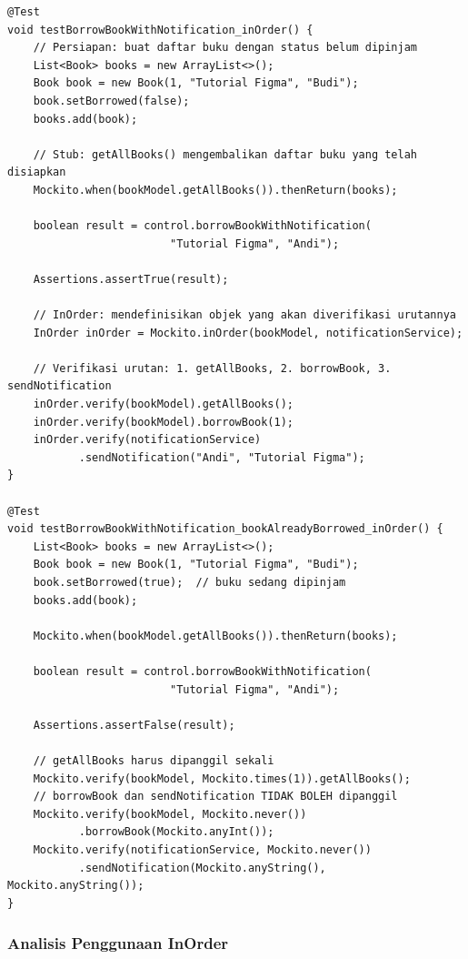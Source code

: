 \documentclass[12pt,a4paper]{article}
\begin{document}
\begin{lstlisting}[caption={Test method peminjaman dengan notifikasi dan InOrder},
                   label={lst:test-notification}]
@Test
void testBorrowBookWithNotification_inOrder() {
    // Persiapan: buat daftar buku dengan status belum dipinjam
    List<Book> books = new ArrayList<>();
    Book book = new Book(1, "Tutorial Figma", "Budi");
    book.setBorrowed(false);
    books.add(book);

    // Stub: getAllBooks() mengembalikan daftar buku yang telah disiapkan
    Mockito.when(bookModel.getAllBooks()).thenReturn(books);

    boolean result = control.borrowBookWithNotification(
                         "Tutorial Figma", "Andi");

    Assertions.assertTrue(result);

    // InOrder: mendefinisikan objek yang akan diverifikasi urutannya
    InOrder inOrder = Mockito.inOrder(bookModel, notificationService);

    // Verifikasi urutan: 1. getAllBooks, 2. borrowBook, 3. sendNotification
    inOrder.verify(bookModel).getAllBooks();
    inOrder.verify(bookModel).borrowBook(1);
    inOrder.verify(notificationService)
           .sendNotification("Andi", "Tutorial Figma");
}

@Test
void testBorrowBookWithNotification_bookAlreadyBorrowed_inOrder() {
    List<Book> books = new ArrayList<>();
    Book book = new Book(1, "Tutorial Figma", "Budi");
    book.setBorrowed(true);  // buku sedang dipinjam
    books.add(book);

    Mockito.when(bookModel.getAllBooks()).thenReturn(books);

    boolean result = control.borrowBookWithNotification(
                         "Tutorial Figma", "Andi");

    Assertions.assertFalse(result);

    // getAllBooks harus dipanggil sekali
    Mockito.verify(bookModel, Mockito.times(1)).getAllBooks();
    // borrowBook dan sendNotification TIDAK BOLEH dipanggil
    Mockito.verify(bookModel, Mockito.never())
           .borrowBook(Mockito.anyInt());
    Mockito.verify(notificationService, Mockito.never())
           .sendNotification(Mockito.anyString(), Mockito.anyString());
}
\end{lstlisting}

\subsubsection{Analisis Penggunaan InOrder}
\end{document}
